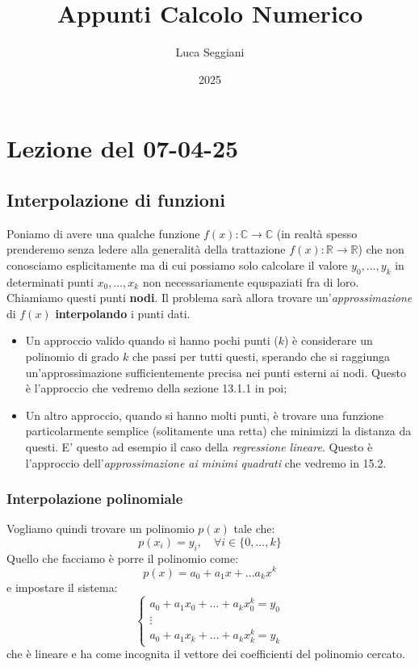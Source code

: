 \documentclass[a4paper,11pt]{article}
\title{Appunti Calcolo Numerico}
\author{Luca Seggiani}
\date{2025}
\begin{document}
\section{Lezione del 07-04-25}

\thispagestyle{empty}
\pagestyle{fancy}

\subsection{Interpolazione di funzioni}
Poniamo di avere una qualche funzione $f(x) : \mathbb{C} \rightarrow \mathbb{C}$ (in realtà spesso prenderemo senza ledere alla generalità della trattazione $f(x) : \mathbb{R} \rightarrow \mathbb{R}$) che non conosciamo esplicitamente ma di cui possiamo solo calcolare il valore $y_0, ..., y_k$ in determinati punti $x_0, ..., x_k$ non necessariamente equspaziati fra di loro.
Chiamiamo questi punti \textbf{nodi}.
Il problema sarà allora trovare un'\textit{approssimazione} di $f(x)$ \textbf{interpolando} i punti dati.
\begin{itemize}
	\item 
Un approccio valido quando si hanno pochi punti ($k$) è considerare un polinomio di grado $k$ che passi per tutti questi, sperando che si raggiunga un'approssimazione sufficientemente precisa nei punti esterni ai nodi.
Questo è l'approccio che vedremo della sezione 13.1.1 in poi;
	\item
Un altro approccio, quando si hanno molti punti, è trovare una funzione particolarmente semplice (solitamente una retta) che minimizzi la distanza da questi.
E' questo ad esempio il caso della \textit{regressione lineare}.
Questo è l'approccio dell'\textit{approssimazione ai minimi quadrati} che vedremo in 15.2.
\end{itemize}

\subsubsection{Interpolazione polinomiale}
Vogliamo quindi trovare un polinomio $p(x)$ tale che:
$$
p(x_i) = y_i, \quad \forall i \in \{ 0, ..., k \}
$$
Quello che facciamo è porre il polinomio come:
$$
p(x) = a_0 + a_1 x + ... a_k x^k
$$
e impostare il sistema:
\[
	\begin{cases}
		a_0 + a_1 x_0 + ... + a_k x_0^k = y_0 \\ 
		\vdots \\
		a_0 + a_1 x_k + ... + a_k x_k^k = y_k
	\end{cases}
\]
che è lineare e ha come incognita il vettore dei coefficienti del polinomio cercato.
\end{document}
